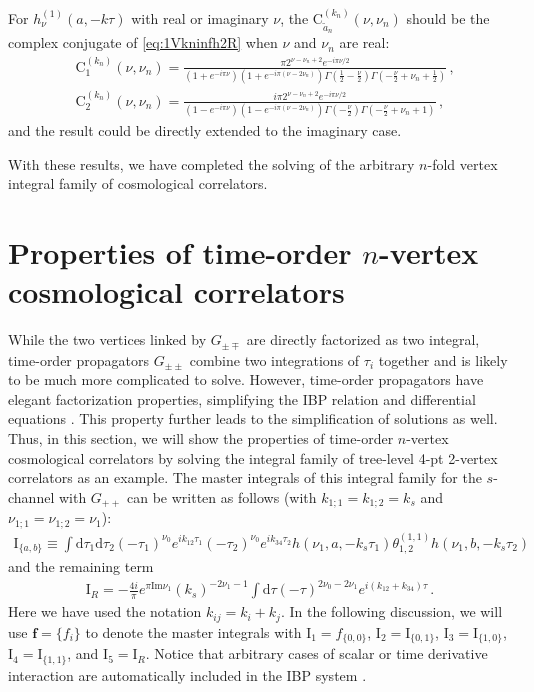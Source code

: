 \documentclass[a4paper,11pt]{article}
\newcommand{\nn}{\nonumber}
\newcommand{\nd}{\mathrm{d}}
\def\ie{\begin{equation}\begin{aligned}}
\def\fe{\end{aligned}\end{equation}}
\begin{document}
For  $h^{(1)}_\nu(a,-k\tau)$ with real or   imaginary $\nu$, the $\text{C}_{\tilde{a}_n}^{(k_n)}(\nu,\nu_n)$ should be the complex conjugate of \eqref{eq:1Vkninfh2R} when $\nu$ and $\nu_n$ are real:
\begin{align}
&\text{C}_1^{(k_n)}(\nu,\nu_n) =\frac{\pi  2^{\nu-\nu _n+2} e^{-i \pi \nu/2 } }
{ \left(1+e^{-i \pi  \nu}\right)
\left(1+e^{-i \pi  \left(\nu-2 \nu_n\right)}\right) 
\Gamma \left(\frac{1}{2}-\frac{\nu}{2}\right)
\Gamma\left(-\frac{\nu}{2}+\nu_n+\frac{1}{2}\right)}  \,,\nn\\
&\text{C}_2^{(k_n)}(\nu,\nu_n) =\frac{i \pi  2^{\nu-\nu _n+2} e^{-i \pi \nu /2} }
{\left(1-e^{-i \pi  \nu}\right)
\left(1-e^{-i \pi  \left(\nu-2 \nu_n\right)}\right) 
\Gamma \left(-\frac{\nu}{2}\right) 
\Gamma\left(-\frac{\nu}{2}+\nu_n+1\right)}    \, , \label{eq:1Vkninfh1}
\end{align}
and the result could be directly extended to the imaginary case.

With these results, we have completed the solving of the arbitrary $n$-fold vertex integral family of cosmological correlators.







\section{Properties of time-order $n$-vertex cosmological correlators}\label{sec:2-v}

While the two vertices linked by $G_{\pm\mp}$ are directly factorized as two integral, time-order propagators $G_{\pm\pm}$ combine two integrations of $\tau_i$ together and is likely to be much more complicated to solve. However, time-order propagators have elegant factorization properties, simplifying the IBP relation and differential equations \cite{Chen:2023iix}. This property further leads to the simplification of solutions as well. Thus, in this section, we will show the properties of time-order $n$-vertex cosmological correlators by
solving the integral family of tree-level 4-pt 2-vertex correlators as an example. The master integrals of this integral family for the $s$-channel with $G_{++}$ can be written as follows (with $k_{1;1}=k_{1;2}=k_s$ and $\nu_{1;1}=\nu_{1;2}=\nu_1$):
\ie
\text{I}_{\{a,b\}} \equiv \int \nd \tau_1 \nd \tau_2  (-\tau_1)^{\nu_{0}}e^{ik_{12}\tau_1}(-\tau_2)^{\nu_{0}}e^{ik_{34}\tau_2}h(\nu_1,a,-k_s\tau_1) \theta_{1,2}^{(1,1)} h(\nu_1,b,-k_s\tau_2)
\fe
and the remaining term
\ie
\text{I}_R=-\frac{4i}{\pi} e^{\pi \text{Im}\nu_1} (k_s)^{-2\nu_{1}-1} \int \nd \tau (-\tau)^{2\nu_0-2\nu_1}e^{i(k_{12}+k_{34})\tau}\, .
\fe
Here we have used the notation $k_{ij}=k_i+k_j$. In the following discussion, we will use $\bm{f}=\{f_i\}$ to denote the master integrals with $\text{I}_1= f_{\{0,0\}}$, $\text{I}_2= \text{I}_{\{0,1\}}$, $\text{I}_3= \text{I}_{\{1,0\}}$, $\text{I}_4= \text{I}_{\{1,1\}}$, and $\text{I}_5= \text{I}_R$. Notice that arbitrary cases of scalar or time derivative interaction are automatically included in the IBP system \cite{Chen:2023iix}. 
\end{document}
